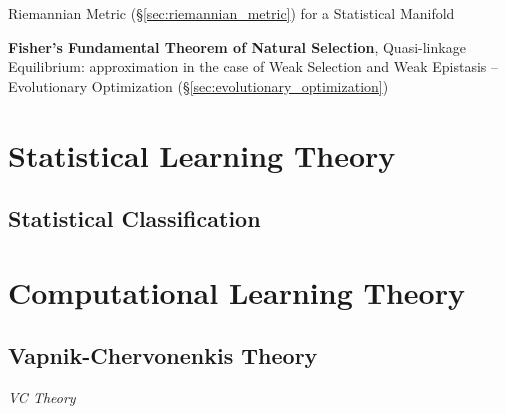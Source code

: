 Riemannian Metric (\S\ref{sec:riemannian_metric}) for a Statistical
Manifold

\fist \textbf{Fisher's Fundamental Theorem of Natural Selection},
Quasi-linkage Equilibrium: approximation in the case of Weak Selection
and Weak Epistasis -- Evolutionary Optimization
(\S\ref{sec:evolutionary_optimization}) %



\section{Statistical Learning Theory}\label{sec:statistical_learning_theory}




\subsection{Statistical Classification}\label{sec:statistical_classification}



\section{Computational Learning Theory}\label{sec:computational_learning_theory}




\subsection{Vapnik-Chervonenkis Theory}\label{sec:vc_theory}

\emph{VC Theory}
